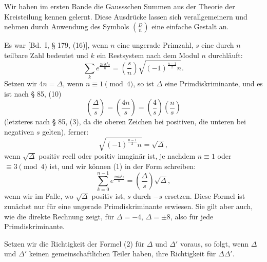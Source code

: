 \documentclass[12pt,a4paper]{article}
\theoremstyle{definition}
\begin{document}
Wir haben im ersten Bande die Gaussschen Summen aus
der Theorie der Kreisteilung kennen gelernt. Diese Ausdr\"ucke
lassen sich verallgemeinern und nehmen durch Anwendung des
Symbols $\left(\frac{D}{n}\right)$ eine einfache Gestalt an.

Es war [Bd.~I, \S{} 179, (16)], wenn $n$ eine ungerade Primzahl,
$s$ eine durch $n$ teilbare Zahl bedeutet und $k$ ein Restsystem
nach dem Modul $n$ durchl\"auft:
\begin{equation}\tag{1}
\sum_k e^{\frac{2\pi i k^2 s}{n}} = \left(\frac{s}{n}\right) \sqrt{(-1)^{\frac{n-1}{2}} n}.
\end{equation}
Setzen wir $4n = \Delta$, wenn $n \equiv 1 \pmod{4}$, so ist $\Delta$
eine Primdiskriminante, und es ist nach \S{} 85, (10)
\begin{equation*}
\left(\frac{\Delta}{s}\right) = \left(\frac{4n}{s}\right) = \left(\frac{4}{s}\right) \left(\frac{n}{s}\right)
\end{equation*}
(letzteres nach \S{} 85, (3), da die oberen Zeichen bei positiven, die
unteren bei negativen $s$ gelten), ferner:
\begin{equation*}
\sqrt{(-1)^{\frac{n-1}{2}} n} = \sqrt{\Delta},
\end{equation*}
wenn $\sqrt{\Delta}$ positiv reell oder positiv imagin\"ar ist, je nachdem $n \equiv 1$
oder $\equiv 3 \pmod{4}$ ist, und wir k\"onnen (1) in der Form schreiben:
\begin{equation}\tag{2}
\sum_{k=0}^{n-1} e^{\frac{2\pi i k^2 s}{n}} = \left(\frac{\Delta}{s}\right) \sqrt{\Delta},
\end{equation}
wenn wir im Falle, wo $\sqrt{\Delta}$ positiv ist, $s$ durch $-s$ ersetzen. Diese
Formel ist zun\"achst nur f\"ur eine ungerade Primdiskriminante
erwiesen. Sie gilt aber auch, wie die direkte Rechnung zeigt, f\"ur
$\Delta = -4$, $\Delta = \pm 8$,
also f\"ur jede Primdiskriminante.

Setzen wir die Richtigkeit der Formel (2) f\"ur $\Delta$ und
$\Delta'$ voraus, so folgt, wenn $\Delta$ und $\Delta'$ keinen gemeinschaftlichen
Teiler haben, ihre Richtigkeit f\"ur $\Delta\Delta'$.
\end{document}
